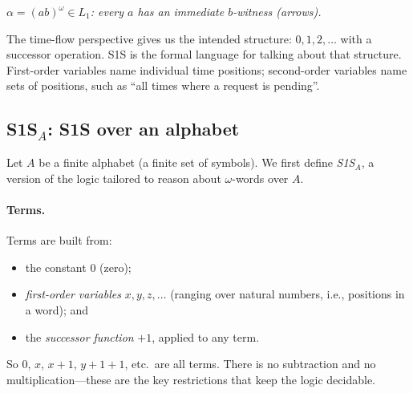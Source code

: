 \begin{center}
  \par
  {\small\itshape $\alpha = (ab)^\omega \in L_1$: every $a$ has an
  immediate $b$-witness (arrows).}
\end{center}

The time-flow perspective gives us the intended structure:
$0,1,2,\ldots$ with a successor operation.  S1S is the formal language for
talking about that structure.  First-order variables name individual time
positions; second-order variables name sets of positions, such as ``all
times where a request is pending''.

\subsection{S1S$_A$: S1S over an alphabet}

Let $A$ be a finite alphabet (a finite set of symbols).  We first define
\emph{S1S$_A$}, a version of the logic tailored to reason about
$\omega$-words over $A$.

\paragraph{Terms.}
Terms are built from:
\begin{itemize}
  \item the constant $0$ (zero);
  \item \emph{first-order variables} $x, y, z, \ldots$ (ranging over
        natural numbers, i.e., positions in a word); and
  \item the \emph{successor function} $+1$, applied to any term.
\end{itemize}
So $0$, $x$, $x+1$, $y+1+1$, etc.\ are all terms.  There is no subtraction
and no multiplication---these are the key restrictions that keep the logic
decidable.

